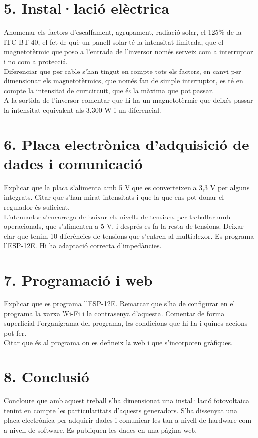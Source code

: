 \section*{5. Instal·lació elèctrica}
Anomenar els factors d'escalfament, agrupament, radiació solar, el 125\% de la ITC-BT-40, el fet de què un panell solar té la intensitat limitada, que el magnetotèrmic que poso a l'entrada de l'inversor només serveix com a interruptor i no com a protecció.\\
\newline Diferenciar que per cable s'han tingut en compte tots els factors, en canvi per dimensionar els magnetotèrmics, que només fan de simple interruptor, es té en compte la intensitat de curtcircuit, que és la màxima que pot passar.\\
\newline A la sortida de l'inversor comentar que hi ha un magnetotèrmic que deixés passar la intensitat equivalent als 3.300 W i un diferencial.

\section*{6. Placa electrònica d'adquisició de dades i comunicació}
Explicar que la placa s'alimenta amb 5 V que es converteixen a 3,3 V per alguns integrats. Citar que s'han mirat intensitats i que la que ens pot donar el regulador és suficient.\\
\newline L'atenuador s'encarrega de baixar els nivells de tensions per treballar amb operacionals, que s'alimenten a 5 V, i després es fa la resta de tensions. Deixar clar que tenim 10 diferències de tensions que s'entren al multiplexor. Es programa l'ESP-12E. Hi ha adaptació correcta d'impedàncies. 

\section*{7. Programació i web}
Explicar que es programa l'ESP-12E. Remarcar que s'ha de configurar en el programa la xarxa Wi-Fi i la contrasenya d'aquesta. Comentar de forma superficial l'organigrama del programa, les condicions que hi ha i quines accions pot fer.\\
\newline Citar que és al programa on es defineix la web i que s'incorporen gràfiques.

\section*{8. Conclusió}
Concloure que amb aquest treball s'ha dimensionat una instal·lació fotovoltaica tenint en compte les particularitats d'aquests generadors. S'ha dissenyat una placa electrònica per adquirir dades i comunicar-les tan a nivell de hardware com a nivell de software. Es publiquen les dades en una pàgina web.


